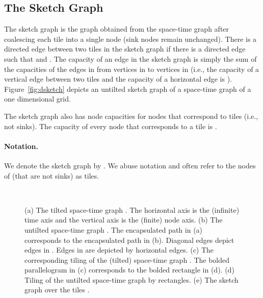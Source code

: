 \documentclass[11pt]{article}
\newenvironment{proof sketch}[1]{\noindent {\emph{Proof sketch of #1:}}}{\hfill \qed}
\begin{document}
\subsection{The Sketch Graph}\label{sect:sketchgraph}
The sketch graph is the graph obtained from the space-time graph after coalescing
each tile into a single node (sink nodes remain unchanged).  There is a directed edge
 between two tiles  in the sketch graph if there is a directed
edge  such that  and . The
capacity  of an edge  in the sketch graph is simply the sum of
the capacities of the edges in  from vertices in  to vertices in 
(i.e., the capacity of a vertical edge between two tiles  and the capacity of a
horizontal edge is ).  Figure~\ref{fig:dsketch} depicts an untilted sketch graph
of a space-time graph of a one dimensional grid.

The sketch graph also has node capacities for nodes that correspond to tiles (i.e.,
not sinks). The capacity of every node that corresponds to a tile is .
\paragraph{Notation.}
We denote the sketch graph by .
We abuse notation and often refer to the nodes of  (that are not sinks) as tiles.


\begin{figure}\centering
   \qquad
  \\ \quad
{}\quad
\caption{\footnotesize(a) The tilted space-time graph . The  horizontal axis is the (infinite) time axis and the vertical axis is the (finite) node axis.
(b) The untilted space-time graph . The encapsulated path in (a) corresponds to the encapsulated path in (b).
Diagonal edges depict edges in . Edges in  are depicted by horizontal edges.
(c) The corresponding tiling of the (tilted) space-time graph . The bolded parallelogram in (c) corresponds to the bolded rectangle in (d).
(d) Tiling of the untilted space-time graph  by  rectangles.
(e) The sketch graph over the tiles .
}
\end{figure}
\end{document}
